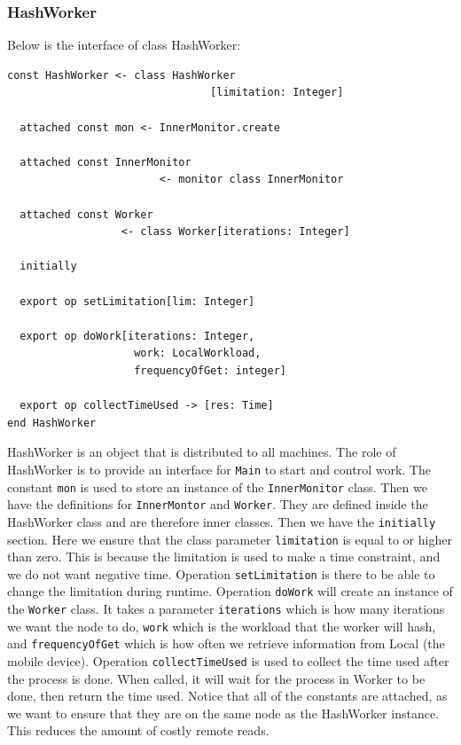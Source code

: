 \subsubsection{HashWorker}
Below is the interface of class HashWorker:
\begin{lstlisting}[language=emerald]
const HashWorker <- class HashWorker
                                [limitation: Integer]

  attached const mon <- InnerMonitor.create

  attached const InnerMonitor 
                        <- monitor class InnerMonitor

  attached const Worker
                  <- class Worker[iterations: Integer]

  initially

  export op setLimitation[lim: Integer]
  
  export op doWork[iterations: Integer, 
                    work: LocalWorkload, 
                    frequencyOfGet: integer]

  export op collectTimeUsed -> [res: Time]
end HashWorker
\end{lstlisting}
HashWorker is an object that is distributed to all machines. The role of HashWorker is to provide an interface for \verb|Main| to start and control work. The constant \verb|mon| is used to store an instance of the \verb|InnerMonitor| class. Then we have the definitions for \verb|InnerMontor| and \verb|Worker|. They are defined inside the HashWorker class and are therefore inner classes. Then we have the \verb|initially| section. Here we ensure that the class parameter \verb|limitation| is equal to or higher than zero. This is because the limitation is used to make a time constraint, and we do not want negative time. Operation \verb|setLimitation| is there to be able to change the limitation during runtime. Operation \verb|doWork| will create an instance of the \verb|Worker| class. It takes a parameter \verb|iterations| which is how many iterations we want the node to do, \verb|work| which is the workload that the worker will hash, and \verb|frequencyOfGet| which is how often we retrieve information from Local (the mobile device). Operation \verb|collectTimeUsed| is used to collect the time used after the process is done. When called, it will wait for the process in Worker to be done, then return the time used.
Notice that all of the constants are attached, as we want to ensure that they are on the same node as the HashWorker instance. This reduces the amount of costly remote reads.




